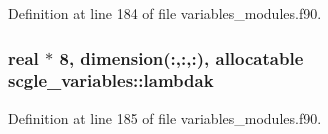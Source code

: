 Definition at line 184 of file variables\+\_\+modules.\+f90.

\subsubsection[{\texorpdfstring{lambdak}{lambdak}}]{\setlength{\rightskip}{0pt plus 5cm}real $\ast$ 8, dimension(\+:,\+:,\+:), allocatable scgle\+\_\+variables\+::lambdak}\hypertarget{namespacescgle__variables_a5adad1368d8a9059bbe1bca9352e7143}{}\label{namespacescgle__variables_a5adad1368d8a9059bbe1bca9352e7143}


Definition at line 185 of file variables\+\_\+modules.\+f90.

